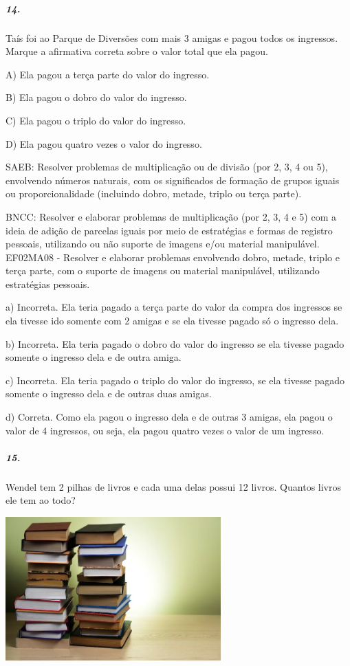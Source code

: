 \subparagraph{14. }\label{section-113}

Taís foi ao Parque de Diversões com mais 3 amigas e pagou todos os ingressos. Marque a afirmativa correta sobre o valor total que ela pagou.

A) Ela pagou a terça parte do valor do ingresso.

B) Ela pagou o dobro do valor do ingresso.

C) Ela pagou o triplo do valor do ingresso.

D) Ela pagou quatro vezes o valor do ingresso.

SAEB: Resolver problemas de multiplicação ou de divisão (por 2,
3, 4 ou 5), envolvendo números naturais, com os significados de formação
de grupos iguais ou proporcionalidade (incluindo dobro, metade, triplo
ou terça parte).

BNCC: Resolver e elaborar problemas de multiplicação (por 2,
3, 4 e 5) com a ideia de adição de parcelas iguais por meio de
estratégias e formas de registro pessoais, utilizando ou não suporte de
imagens e/ou material manipulável. EF02MA08 - Resolver e elaborar
problemas envolvendo dobro, metade, triplo e terça parte, com o suporte
de imagens ou material manipulável, utilizando estratégias pessoais.

a) Incorreta. Ela teria pagado a terça parte do valor da compra dos ingressos se ela
tivesse ido somente com 2 amigas e se ela tivesse pagado só o ingresso
dela.

b) Incorreta. Ela teria pagado o dobro do valor do ingresso se ela
tivesse pagado somente o ingresso dela e de outra amiga.

c) Incorreta. Ela teria pagado o triplo do valor do ingresso, se ela
tivesse pagado somente o ingresso dela e de outras duas amigas.

d) Correta. Como ela pagou o ingresso dela e de outras 3 amigas, ela
pagou o valor de 4 ingressos, ou seja, ela pagou quatro vezes o valor de um ingresso.

\subparagraph{15. }\label{section-114}

Wendel tem 2 pilhas de livros e cada uma delas possui 12 livros. Quantos livros ele tem ao todo?

\includegraphics[width=3.26042in,height=2.17361in]{media/image124.jpeg}

